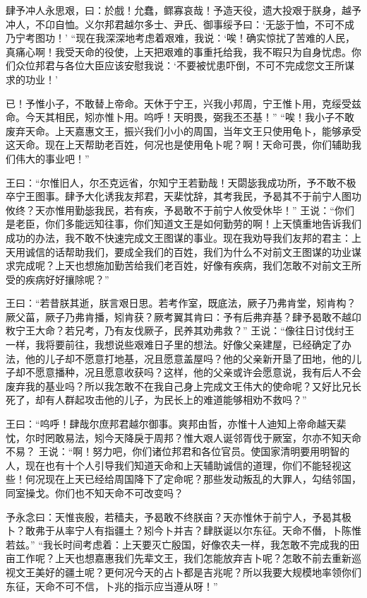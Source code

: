 \documentclass[a4paper,12pt,UTF8,twoside]{ctexbook}
\begin{document}
肆予冲人永思艰，曰：於戲！允蠢，鳏寡哀哉！予造天役，遗大投艰于朕身，越予冲人，不卬自恤。义尔邦君越尔多士、尹氏、御事绥予曰：‘无毖于恤，不可不成乃宁考图功！’
“现在我深深地考虑着艰难，我说：‘唉！确实惊扰了苦难的人民，真痛心啊！我受天命的役使，上天把艰难的事重托给我，我不暇只为自身忧虑。你们众位邦君与各位大臣应该安慰我说：‘不要被忧患吓倒，不可不完成您文王所谋求的功业！’

已！予惟小子，不敢替上帝命。天休于宁王，兴我小邦周，宁王惟卜用，克绥受兹命。今天其相民，矧亦惟卜用。呜呼！天明畏，弼我丕丕基！”
“唉！我小子不敢废弃天命。上天嘉惠文王，振兴我们小小的周国，当年文王只使用龟卜，能够承受这天命。现在上天帮助老百姓，何况也是使用龟卜呢？啊！天命可畏，你们辅助我们伟大的事业吧！”

王曰：“尔惟旧人，尔丕克远省，尔知宁王若勤哉！天閟毖我成功所，予不敢不极卒宁王图事。肆予大化诱我友邦君，天棐忱辞，其考我民，予曷其不于前宁人图功攸终？天亦惟用勤毖我民，若有疾，予曷敢不于前宁人攸受休毕！”
王说：“你们是老臣，你们多能远知往事，你们知道文王是如何勤劳的啊！上天慎重地告诉我们成功的办法，我不敢不快速完成文王图谋的事业。现在我劝导我们友邦的君主：上天用诚信的话帮助我们，要成全我们的百姓，我们为什么不对前文王图谋的功业谋求完成呢？上天也想施加勤苦给我们老百姓，好像有疾病，我们怎敢不对前文王所受的疾病好好攘除呢？”

王曰：“若昔朕其逝，朕言艰日思。若考作室，既底法，厥子乃弗肯堂，矧肯构？厥父菑，厥子乃弗肯播，矧肯获？厥考翼其肯曰：予有后弗弃基？肆予曷敢不越卬敉宁王大命？若兄考，乃有友伐厥子，民养其劝弗救？”
王说：“像往日讨伐纣王一样，我将要前往，我想说些艰难日子里的想法。好像父亲建屋，已经确定了办法，他的儿子却不愿意打地基，况且愿意盖屋吗？他的父亲新开垦了田地，他的儿子却不愿意播种，况且愿意收获吗？这样，他的父亲或许会愿意说，我有后人不会废弃我的基业吗？所以我怎敢不在我自己身上完成文王伟大的使命呢？又好比兄长死了，却有人群起攻击他的儿子，为民长上的难道能够相劝不救吗？”

王曰：“呜呼！肆哉尔庶邦君越尔御事。爽邦由哲，亦惟十人迪知上帝命越天棐忱，尔时罔敢易法，矧今天降戾于周邦？惟大艰人诞邻胥伐于厥室，尔亦不知天命不易？
王说：“啊！努力吧，你们诸位邦君和各位官员。使国家清明要用明智的人，现在也有十个人引导我们知道天命和上天辅助诚信的道理，你们不能轻视这些！何况现在上天已经给周国降下了定命呢？那些发动叛乱的大罪人，勾结邻国，同室操戈。你们也不知天命不可改变吗？

予永念曰：天惟丧殷，若穑夫，予曷敢不终朕亩？天亦惟休于前宁人，予曷其极卜？敢弗于从率宁人有指疆土？矧今卜并吉？肆朕诞以尔东征。天命不僭，卜陈惟若兹。”
“我长时间考虑着：上天要灭亡殷国，好像农夫一样，我怎敢不完成我的田亩工作呢？上天也想嘉惠我们先辈文王，我们怎能放弃吉卜呢？怎敢不前去重新巡视文王美好的疆土呢？更何况今天的占卜都是吉兆呢？所以我要大规模地率领你们东征，天命不可不信，卜兆的指示应当遵从呀！”
\end{document}

